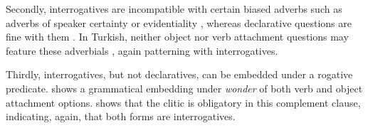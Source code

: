 \documentclass[output=paper,colorlinks,citecolor=brown]{langscibook}
\begin{document}
Secondly, interrogatives are incompatible with certain biased adverbs such as adverbs of speaker certainty or evidentiality \citep{huddleston94}, whereas declarative questions are fine with them \citep{gunlogson}.  In Turkish, neither object nor verb attachment questions may feature these adverbials , again patterning with interrogatives.
\ea\label{ex:11:10}
\label{ex:11:10a}
\label{ex:11:10b}
\z
\z

Thirdly, interrogatives, but not declaratives, can be embedded under a rogative predicate.  shows a grammatical embedding under \textit{wonder} of both verb and object attachment options.  shows that the clitic  is obligatory in this complement clause, indicating, again, that both forms are interrogatives.
\ea\label{ex:11:11}
\label{ex:11:11a}
\label{ex:11:11b}
\z
\z
\end{document}

